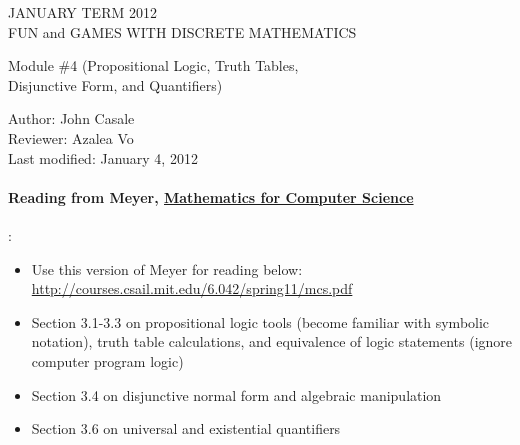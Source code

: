 \documentclass[12pt]{article}
\begin{document}
\begin{center}
\large
JANUARY TERM 2012 \\
FUN and GAMES WITH DISCRETE MATHEMATICS \\
\medskip

Module \#4 (Propositional Logic, Truth Tables,\\ Disjunctive Form, and Quantifiers)
\end{center}
Author: John Casale\\
Reviewer: Azalea Vo \\
Last modified: January 4, 2012 \\


\paragraph*{Reading from Meyer, \underline{Mathematics for Computer Science}}:

\begin{itemize}
	\item Use this version of Meyer for reading below:\\ \url{http://courses.csail.mit.edu/6.042/spring11/mcs.pdf}
	
	\item Section 3.1-3.3 on propositional logic tools (become familiar with symbolic notation), truth table calculations, and equivalence of logic statements (ignore computer program logic)

	\item Section 3.4 on disjunctive normal form and algebraic manipulation
	
	\item Section 3.6 on universal and existential quantifiers

	
\end{itemize}
\medskip
\end{document}
